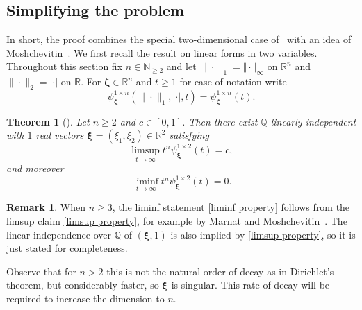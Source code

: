 \documentclass[10pt]{amsart}
\newtheorem{theorem}{Theorem}[section]
\theoremstyle{definition}
\newtheorem{remark}{Remark}
\newcommand{\ux}{\boldsymbol{\xi}}
\newcommand{\uz}{\boldsymbol{\zeta}}
\newcommand{\R}{\mathbb{R}}
\newcommand{\N}{\mathbb{N}}
\newcommand{\Q}{\mathbb{Q}}
\begin{document}
\subsection{Simplifying the problem  } \label{proof dual case}

In short, the proof combines the special two-dimensional case of~\cite{j2} with an idea of Moshchevitin~\cite{ngm}.
We first recall the result on linear forms in two variables. Throughout this section fix $n\in\N_{\geq 2}$ and let $\|\cdot\|_{1}=\Vert\cdot\Vert_{\infty}$ on $\R^{n}$ and $\|\cdot\|_{2}=|\cdot|$ on $\R$. For $\uz \in \R^{n}$ and $t\ge 1$ for ease of notation write
\begin{equation*}
\psi_{\uz}^{1\times n}(\|\cdot\|_{1},|\cdot|,t)=\psi_{\uz}^{1\times n}(t).
\end{equation*}


 \begin{theorem}[\cite{j2}] \label{thm2}
 	Let $n\ge 2$ and $c\in [0,1]$. Then there
 	exist $\Q$-linearly independent with $1$ real vectors $\ux=(\xi_1,\xi_2)\in\R^{2}$ satisfying
 	\begin{equation} 
  \label{limsup property}
 	\limsup_{t\to\infty} t^n \psi_{\ux}^{1\times 2}(t)= c,
 	\end{equation}
 	and moreover
 	\begin{equation} 
  \label{liminf property}
 	\liminf_{t\to\infty} t^n \psi_{\ux}^{1\times 2}(t)= 0.
 	\end{equation}
 \end{theorem}
 
\begin{remark}
	When $n\ge 3$, the liminf statement \eqref{liminf property} follows from the limsup claim \eqref{limsup property}, for example
	by Marnat and Moshchevitin~\cite{mamo}. The linear independence over $\Q$ of $(\ux,1)$
	is also implied by \eqref{limsup property}, so it is just stated for completeness.
\end{remark}

Observe that for $n>2$ this is not the natural order of 
decay as in Dirichlet's theorem, but considerably faster, so $\ux$ is singular.
This rate of decay will be required to increase the dimension to $n$.
\end{document}
